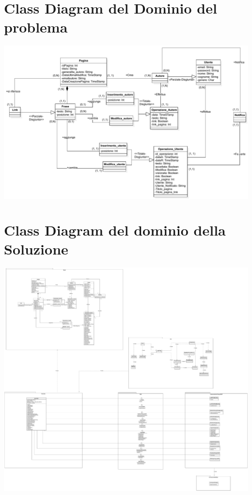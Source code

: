 \documentclass{article}
\begin{document}


\newpage

\tableofcontents

\newpage

\pagestyle{fancy}
\fancyhead[L]{ }

\section{Class Diagram del Dominio del problema}
\includegraphics[width=1\textwidth]{DominioProbelema.pdf}
\section{Class Diagram del dominio della Soluzione}
\includegraphics[width=1.3\textwidth]{DominioSoluzione.pdf}
\end{document}
